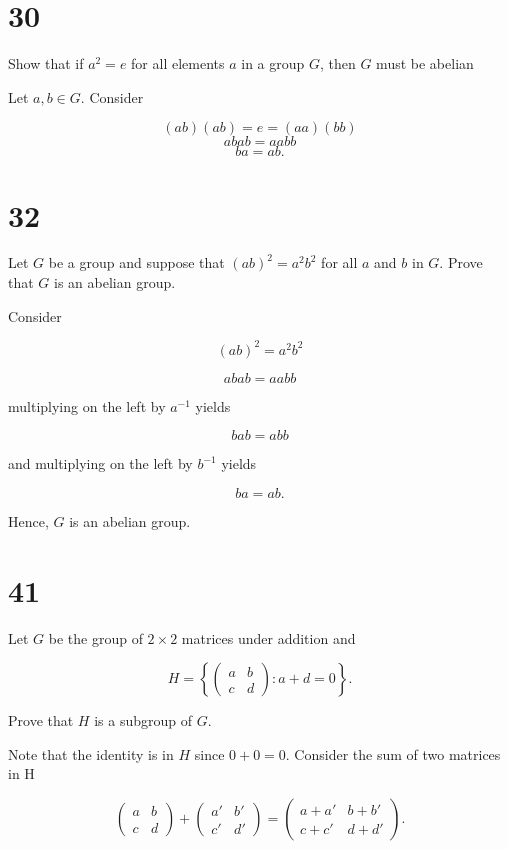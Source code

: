 \documentclass[a4paper]{article}
\begin{document}
\section*{30}

Show that if $a^2 = e$ for all elements $a$ in a group $G$, then $G$ must be abelian

\vspace{\baselineskip}

Let $a,b \in G$. Consider

$$(ab)(ab) = e = (aa)(bb)$$
$$abab = aabb$$
$$ ba = ab.$$


\section*{32}

Let $G$ be a group and suppose that $(ab)^2 = a^2b^2$ for all $a$ and $b$ in $G$. Prove that $G$ is an abelian group.

\vspace{\baselineskip}

Consider

$$(ab)^2 = a^2b^2$$

$$abab = aa bb$$

multiplying on the left by $a^{-1}$ yields

$$bab = abb$$

and multiplying on the left by $b^{-1}$ yields

$$ba = ab.$$

Hence, $G$ is an abelian group.


\section*{41}

Let $G$ be the group of $2 \times 2$ matrices under addition and 

$$ H = \left\{
  \begin{pmatrix}
    a & b \\
    c & d
  \end{pmatrix} : a + d = 0\right\}.
$$

Prove that $H$ is a subgroup of $G$.

\vspace{\baselineskip}

Note that the identity is in $H$ since $0 + 0 = 0$. Consider the sum of two matrices in H

$$\begin{pmatrix}
    a & b \\
    c & d
  \end{pmatrix}
  +
  \begin{pmatrix}
    a' & b' \\
    c' & d'
  \end{pmatrix}
  =
  \begin{pmatrix}
    a + a' & b + b' \\
    c + c' & d + d'
  \end{pmatrix}.
$$
\end{document}
